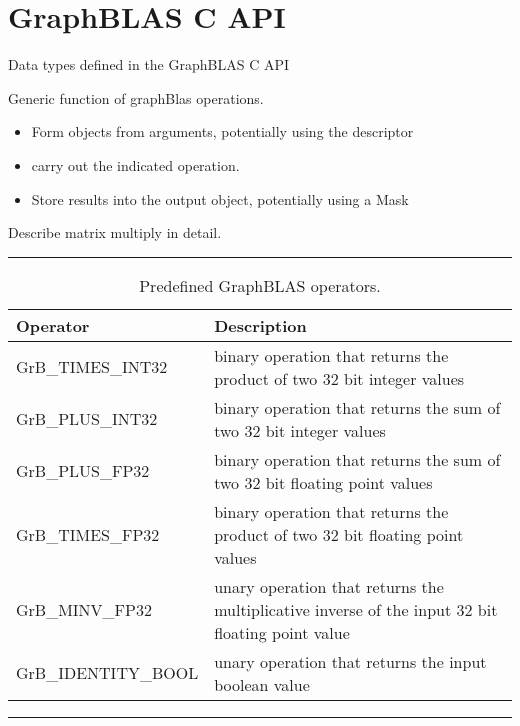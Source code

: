 \section{GraphBLAS C API}
\label{sec:Capi}
Data types defined in the GraphBLAS C API

Generic function of graphBlas operations.
\begin{itemize}
\item Form objects from arguments, potentially using the descriptor
\item carry out the indicated operation.
\item Store results into the output object, potentially using a Mask
\end{itemize}
Describe matrix multiply in detail.  

\begin{table}[h]
\hrule
\begin{center}
\caption{Predefined GraphBLAS operators.}
\label{Tab:GrBops}
\begin{tabular}{ll}
Operator                          & Description  \\
\hline
GrB\_TIMES\_INT32       & binary operation that returns the product of two 32 bit integer values \\
GrB\_PLUS\_INT32         & binary operation that returns the sum of two 32 bit integer values \\
GrB\_PLUS\_FP32          & binary operation that returns the sum of two 32 bit floating point values \\
GrB\_TIMES\_FP32        & binary operation that returns the product of two 32 bit floating point values \\
GrB\_MINV\_FP32          & unary operation that returns the multiplicative inverse of the input 32 bit floating point value \\
GrB\_IDENTITY\_BOOL  & unary operation that returns the input boolean value \\
\end{tabular}
\end{center}
\hrule
\end{table}

